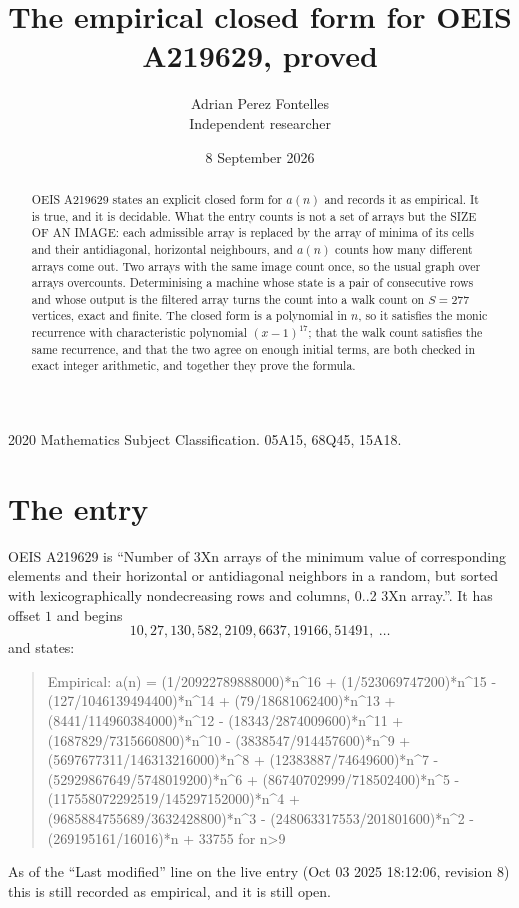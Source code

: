 \documentclass[11pt,a4paper]{article}
\title{The empirical closed form for OEIS A219629, proved}
\author{Adrian Perez Fontelles\\ \small Independent researcher}
\date{8 September 2026}
\theoremstyle{plain}
\theoremstyle{definition}
\begin{document}
\maketitle

\begin{abstract}
OEIS A219629 states an explicit closed form for $a(n)$ and records it as empirical. It is true, and
it is decidable. What the entry counts is not a set of arrays but the SIZE OF AN IMAGE: each
admissible array is replaced by the array of minima of its cells and their antidiagonal, horizontal neighbours,
and $a(n)$ counts how many different arrays come out. Two arrays with the same image count
once, so the usual graph over arrays overcounts. Determinising a machine whose state is a pair
of consecutive rows and whose output is the filtered array turns the count into a walk count on
$S=277$ vertices, exact and finite. The closed form is a polynomial in $n$, so it satisfies the
monic recurrence with characteristic polynomial $(x-1)^{17}$; that the walk count
satisfies the same recurrence, and that the two agree on enough initial terms, are both checked
in exact integer arithmetic, and together they prove the formula.
\end{abstract}

\noindent\small 2020 Mathematics Subject Classification. 05A15, 68Q45, 15A18.\normalsize

\section{The entry}

OEIS A219629 is ``Number of 3Xn arrays of the minimum value of corresponding elements and their horizontal or antidiagonal neighbors in a random, but sorted with lexicographically nondecreasing rows and columns, 0..2 3Xn array.''. It has offset $1$ and begins
\[
10, 27, 130, 582, 2109, 6637, 19166, 51491,\ \dots
\]
and states:
\begin{quote}
Empirical: a(n) = (1/20922789888000)*n\^{}16 + (1/523069747200)*n\^{}15 - (127/1046139494400)*n\^{}14 + (79/18681062400)*n\^{}13 + (8441/114960384000)*n\^{}12 - (18343/2874009600)*n\^{}11 + (1687829/7315660800)*n\^{}10 - (3838547/914457600)*n\^{}9 + (5697677311/146313216000)*n\^{}8 + (12383887/74649600)*n\^{}7 - (52929867649/5748019200)*n\^{}6 + (86740702999/718502400)*n\^{}5 - (117558072292519/145297152000)*n\^{}4 + (9685884755689/3632428800)*n\^{}3 - (248063317553/201801600)*n\^{}2 - (269195161/16016)*n + 33755 for n>9
\end{quote}
As of the ``Last modified'' line on the live entry (Oct 03 2025 18:12:06, revision 8)
this is still recorded as empirical, and it is still open.
\end{document}
